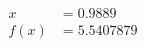 \documentclass[preview]{standalone}
\begin{document}
\begin{align*}
x &= 0.9889\\f(x) &= 5.5407879
\end{align*}
\end{document}
